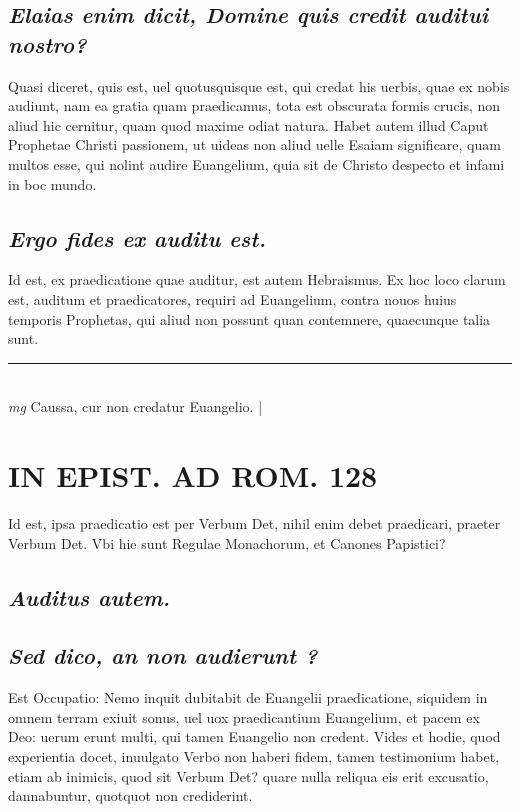 \documentclass{article}
\begin{document}
\begin{pages}
\subsection*{\textit{Elaias enim dicit, Domine quis credit auditui nostro? }}\pstart Quasi diceret, quis est, uel quotusquisque est, qui credat his uerbis, quae ex nobis audiunt, nam ea gratia quam praedicamus, tota est obscurata formis crucis, non aliud hic cernitur, quam quod maxime odiat natura. Habet autem illud Caput Prophetae Christi passionem, ut uideas non aliud uelle Esaiam significare, quam multos esse, qui nolint audire Euangelium, quia sit de Christo despecto et infami in boc mundo.   \pend
{}
{}
\subsection*{\textit{Ergo fides ex auditu est. }}\pstart Id est, ex praedicatione quae auditur, est autem Hebraismus. Ex hoc loco clarum est, auditum et praedicatores, requiri ad Euangelium, contra nouos huius temporis Prophetas, qui aliud non possunt quan contemnere, quaecunque talia sunt.   \pend
\vspace{0.5cm}\noindent
\vspace{0.2cm}\rule{1cm}{0.2pt}\\ 
\hspace{0.2cm}\textit{mg}
\footnotesize Caussa, cur non credatur Euangelio.  
\normalsize| 
\section*{IN EPIST. AD ROM.  128 }\pstart Id est, ipsa praedicatio est per Verbum Det, nihil enim debet praedicari, praeter Verbum Det. Vbi hie sunt Regulae Monachorum, et Canones Papistici?  \pend
{}
{}
\subsection*{\textit{Auditus autem. }}
{}
\subsection*{\textit{Sed dico, an non audierunt ? }}\pstart Est Occupatio: Nemo inquit dubitabit de Euangelii praedicatione, siquidem in omnem terram exiuit sonus, uel uox praedicantium Euangelium, et pacem ex Deo: uerum erunt multi, qui tamen Euangelio non credent. Vides et hodie, quod experientia docet, inuulgato Verbo non haberi fidem, tamen testimonium habet, etiam ab inimicis, quod sit Verbum Det? quare nulla reliqua eis erit excusatio, dannabuntur, quotquot non crediderint.   \pend
{}
{}

\end{pages}
\end{document}
